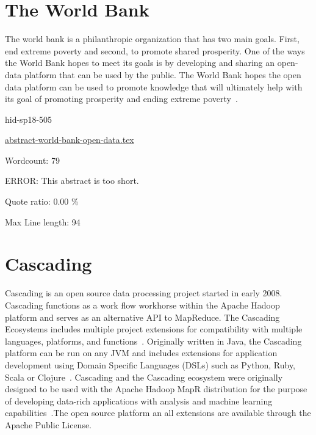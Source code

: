 \section{The World Bank}

The world bank is a philanthropic organization that has two main goals.  First,
end extreme poverty and second, to promote shared prosperity.  One of the ways
the World Bank hopes to meet its goals is by developing and sharing an
open-data platform that can be used by the public.  The World Bank hopes the
open data platform can be used to promote knowledge that will ultimately help
with its goal of promoting prosperity and ending extreme poverty~\cite{hid-sp18-505-Bank2018}.


\begin{IU}

hid-sp18-505

\href{https://github.com/cloudmesh-community/hid-sp18-505/blob/master//technology/abstract-world-bank-open-data.tex}{abstract-world-bank-open-data.tex}

 

Wordcount: 79

ERROR: This abstract is too short.


Quote ratio: 0.00 \%
 
Max Line length: 94
\end{IU}

\section{Cascading}

Cascading is an open source data processing project started in early
2008. Cascading functions as a work flow workhorse within the Apache
Hadoop platform and serves as an alternative API to MapReduce. The
Cascading Ecosystems includes multiple project extensions for
compatibility with multiple languages, platforms, and
functions~\cite{hid-sp18-507-CascadingEco}. Originally written in
Java, the Cascading platform can be run on any JVM and includes
extensions for application development using Domain Specific Languages
(DSLs) such as Python, Ruby, Scala or
Clojure~\cite{hid-sp18-507-GitHubCascading}. Cascading and the
Cascading ecosystem were originally designed to be used with the
Apache Hadoop MapR distribution for the purpose of developing
data-rich applications with analysis and machine learning
capabilities~\cite{hid-sp18-507-MapR}.The open source platform an all
extensions are available through the Apache Public License.


